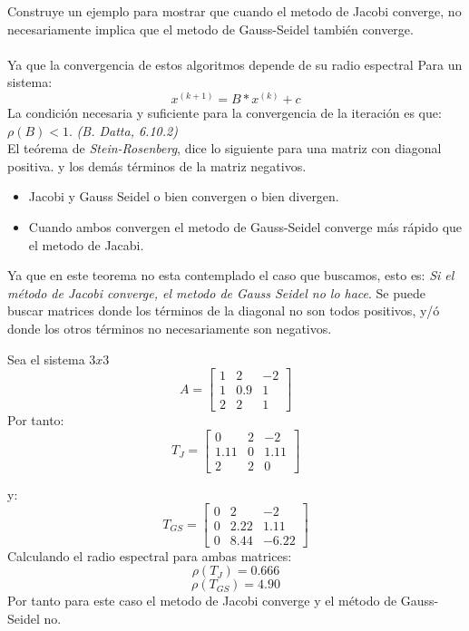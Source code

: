     Construye un ejemplo para mostrar que cuando el metodo de Jacobi converge, no necesariamente
    implica que el metodo de Gauss-Seidel también converge.\\\\
    Ya que la convergencia de estos algoritmos depende de su radio espectral
    Para un sistema: 
    \[
        x^{(k+1)} = B*x^{(k)} + c
    \]
    La condición necesaria y suficiente para la convergencia de la iteración es que: $\rho(B) < 1$.  \textit{(B. Datta, 6.10.2)}\\ 

    El teórema de \textit{Stein-Rosenberg}, dice lo siguiente para una matriz con diagonal positiva.
    y los demás términos de la matriz negativos.
    \begin{itemize}
        \item Jacobi y Gauss Seidel o bien convergen o bien divergen.
        \item Cuando ambos convergen el metodo de Gauss-Seidel converge más rápido
        que el metodo de Jacabi.
    \end{itemize}
    Ya que en este teorema no esta contemplado el caso que buscamos, esto es: \textit{Si el método
    de Jacobi converge, el metodo de Gauss Seidel no lo hace}.
    Se puede buscar matrices donde los términos de la diagonal no son todos positivos, y/ó donde los otros términos
    no necesariamente son negativos.
    
    Sea el sistema $3x3$ 
    \[
        A =
            \begin{bmatrix}
                1 & 2 & -2 \\
                1 & 0.9 & 1\\
                2 & 2 & 1
            \end{bmatrix}
    \]
    Por tanto: 
    \[
        T_{J} =
            \begin{bmatrix}
                0 & 2 & -2 \\
                1.11 & 0 & 1.11\\
                2 & 2 & 0
            \end{bmatrix}   
    \]
    
    y: 
    \[
        T_{GS} =
            \begin{bmatrix}
                0 & 2 & -2 \\
                0 & 2.22 & 1.11\\
                0 & 8.44 & -6.22
            \end{bmatrix}   
    \]
    Calculando el radio espectral para ambas matrices:
    \[
            \rho(T_{J}) = 0.666
    \]
    \[
            \rho(T_{GS}) = 4.90
    \]
    Por tanto para este caso el metodo de Jacobi converge y el método de Gauss-Seidel no.
